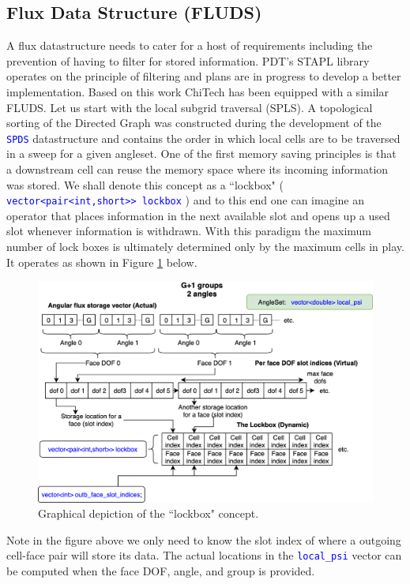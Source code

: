\documentclass[11pt,letterpaper,titlepage]{article}
\newcommand{\xmltag}[1]{\textcolor{blue}{ \texttt{#1}} }
\numberwithin{equation}{section}
\begin{document}
\subsection{Flux Data Structure (FLUDS)}
A flux datastructure needs to cater for a host of requirements including the prevention of having to filter for stored information. PDT's STAPL library operates on the principle of filtering and plans are in progress \cite{AdamsSPDS} to develop a better implementation. Based on this work ChiTech has been equipped with a similar FLUDS.
\newline
\newline
Let us start with the local subgrid traversal (SPLS). A topological sorting of the Directed Graph was constructed during the development of the \xmltag{SPDS} datastructure and contains the order in which local cells are to be traversed in a sweep for a given angleset. One of the first memory saving principles is that a downstream cell can reuse the memory space where its incoming information was stored. We shall denote this concept as a ``lockbox" (\xmltag{vector<pair<int,short>> lockbox}) and to this end one can imagine an operator that places information in the next available slot and opens up a used slot whenever information is withdrawn. With this paradigm the maximum number of lock boxes is ultimately determined only by the maximum cells in play. It operates as shown in Figure \ref{fig:lockbox} below.

\begin{figure}[H]
\centering
\includegraphics[width=0.9\linewidth]{LatexDraw/Lockbox}
\caption{Graphical depiction of the ``lockbox" concept.}
\label{fig:lockbox}
\end{figure}

Note in the figure above we only need to know the slot index of where a outgoing cell-face pair will store its data. The actual locations in the \xmltag{local\_psi} vector can be computed when the face DOF, angle, and group is provided.
\newline
\end{document}
